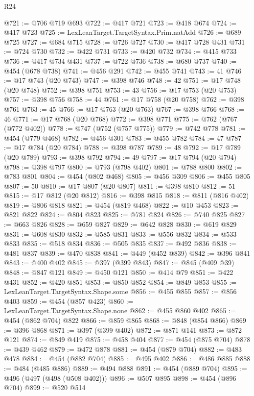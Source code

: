 \begin{lexlean}{R24}
\begin{coremodule}
@721 := @706 @719 @693
@722 := @417 @721
@723 := @418 @674
@724 := @417 @723
@725 := LexLeanTarget.TargetSyntax.Prim.natAdd
@726 := @689 @725
@727 := @684 @715
@728 := @726 @727
@730 := @417 @728 @431
@731 := @724 @730
@732 := @422 @731
@733 := @420 @732
@734 := @415 @733
@736 := @417 @734 @431
@737 := @722 @736
@738 := @680 @737
@740 := @454 (@678 @738)
@741 := @456 @291
@742 := @455 @741
@743 := 41
@746 := @17 @743 (@20 @743)
@747 := @398 @746
@748 := 42
@751 := @17 @748 (@20 @748)
@752 := @398 @751
@753 := 43
@756 := @17 @753 (@20 @753)
@757 := @398 @756
@758 := 44
@761 := @17 @758 (@20 @758)
@762 := @398 @761
@763 := 45
@766 := @17 @763 (@20 @763)
@767 := @398 @766
@768 := 46
@771 := @17 @768 (@20 @768)
@772 := @398 @771
@775 := @762 (@767 (@772 @402))
@778 := @747 (@752 (@757 @775))
@779 := @742 @778
@781 := @454 (@779 @468)
@782 := @456 @301
@783 := @455 @782
@784 := 47
@787 := @17 @784 (@20 @784)
@788 := @398 @787
@789 := 48
@792 := @17 @789 (@20 @789)
@793 := @398 @792
@794 := 49
@797 := @17 @794 (@20 @794)
@798 := @398 @797
@800 := @793 (@798 @402)
@801 := @788 @800
@802 := @783 @801
@804 := @454 (@802 @468)
@805 := @456 @309
@806 := @455 @805
@807 := 50
@810 := @17 @807 (@20 @807)
@811 := @398 @810
@812 := 51
@815 := @17 @812 (@20 @812)
@816 := @398 @815
@818 := @811 (@816 @402)
@819 := @806 @818
@821 := @454 (@819 @468)
@822 := @10 @453
@823 := @821 @822
@824 := @804 @823
@825 := @781 @824
@826 := @740 @825
@827 := @663 @826
@828 := @659 @827
@829 := @642 @828
@830 := @619 @829
@831 := @608 @830
@832 := @585 @831
@833 := @556 @832
@834 := @533 @833
@835 := @518 @834
@836 := @505 @835
@837 := @492 @836
@838 := @481 @837
@839 := @470 @838
@841 := @449 (@452 @839)
@842 := @396 @841
@843 := @400 @402
@845 := @397 (@399 @843)
@847 := @845 (@409 @39)
@848 := @847 @121
@849 := @450 @121
@850 := @414 @79
@851 := @422 @431
@852 := @420 @851
@853 := @850 @852
@854 := @849 @853
@855 := LexLeanTarget.TargetSyntax.Shape.some
@856 := @455 @855
@857 := @856 @403
@859 := @454 (@857 @423)
@860 := LexLeanTarget.TargetSyntax.Shape.none
@862 := @455 @860 @402
@865 := @454 (@862 @704) @822
@866 := @859 @865
@868 := @848 (@854 @866)
@869 := @396 @868
@871 := @397 (@399 @402)
@872 := @871 @141
@873 := @872 @121
@874 := @849 @419
@875 := @458 @404
@877 := @454 (@875 @704)
@878 := @439 @462
@879 := @472 @878
@881 := @454 (@879 @704)
@882 := @483 @478
@884 := @454 (@882 @704)
@885 := @495 @402
@886 := @486 @885
@888 := @484 (@485 @886)
@889 := @494 @888
@891 := @454 (@889 @704)
@895 := @496 (@497 (@498 (@508 @402)))
@896 := @507 @895
@898 := @454 (@896 @704)
@899 := @520 @514

\end{coremodule}
\end{lexlean}
